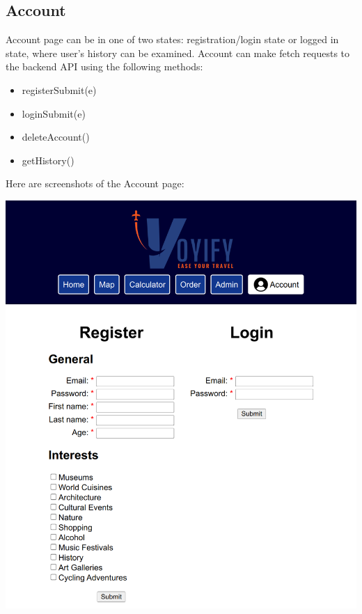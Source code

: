 \documentclass[12pt]{article}
\begin{document}
\subsection{Account}
\label{sec:org2858b2f}
Account page can be in one of two states: registration/login state or logged in state, where user's history can be examined. Account can make fetch requests to the backend API using the following methods:
\begin{itemize}
\item registerSubmit(e)
\end{itemize}
\begin{itemize}
\item loginSubmit(e)
\item deleteAccount()
\item getHistory()
\end{itemize}
Here are screenshots of the Account page:
\begin{center}
\includegraphics[width=\textwidth]{./images/account.png}
\end{center}
\end{document}
